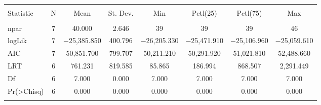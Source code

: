 
\begin{table}[!htbp] \centering 
  \caption{} 
  \label{} 
\begin{tabular}{@{\extracolsep{5pt}}lccccccc} 
\\[-1.8ex]\hline 
\hline \\[-1.8ex] 
Statistic & \multicolumn{1}{c}{N} & \multicolumn{1}{c}{Mean} & \multicolumn{1}{c}{St. Dev.} & \multicolumn{1}{c}{Min} & \multicolumn{1}{c}{Pctl(25)} & \multicolumn{1}{c}{Pctl(75)} & \multicolumn{1}{c}{Max} \\ 
\hline \\[-1.8ex] 
npar & 7 & 40.000 & 2.646 & 39 & 39 & 39 & 46 \\ 
logLik & 7 & $-$25,385.850 & 400.796 & $-$26,205.330 & $-$25,471.910 & $-$25,106.960 & $-$25,059.610 \\ 
AIC & 7 & 50,851.700 & 799.707 & 50,211.210 & 50,291.920 & 51,021.810 & 52,488.660 \\ 
LRT & 6 & 761.231 & 819.585 & 85.865 & 186.994 & 868.507 & 2,291.449 \\ 
Df & 6 & 7.000 & 0.000 & 7.000 & 7.000 & 7.000 & 7.000 \\ 
Pr(\textgreater Chisq) & 6 & 0.000 & 0.000 & 0.000 & 0.000 & 0.000 & 0.000 \\ 
\hline \\[-1.8ex] 
\end{tabular} 
\end{table} 
